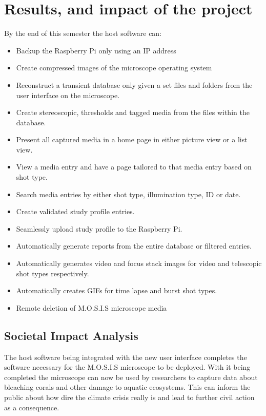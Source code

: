 \documentclass[12pt]{article}
\begin{document}
\section{Results, and impact of the project}
By the end of this semester the host software can:
\begin{itemize}
	\item Backup the Raspberry Pi only using an IP address
	\item Create compressed images of the microscope operating system
	\item Reconstruct a transient database only given a set files and folders from the user interface on the microscope.
	\item Create stereoscopic, thresholds and tagged media from the files within the database.
	\item Present all captured media in a home page in either picture view or a list view.
	\item View a media entry and have a page tailored to that media entry based on shot type.
	\item Search media entries by either shot type, illumination type, ID or date.
	\item Create validated study profile entries.
	\item Seamlessly upload study profile to the Raspberry Pi.
	\item Automatically generate reports from the entire database or filtered entries.
	\item Automatically generates video and focus stack images for video and telescopic shot types respectively.
	\item Automatically creates GIFs for time lapse and burst shot types.
	\item Remote deletion of M.O.S.I.S microscope media
\end{itemize}
\subsection{Societal Impact Analysis}
The host software being integrated with the new user interface completes the software necessary for the M.O.S.I.S microscope to be deployed. With it being completed the microscope can now be used by researchers to capture data about bleaching corals and other damage to aquatic ecosystems. This can inform the public about how dire the climate crisis really is and lead to further civil action as a consequence.
\end{document}
